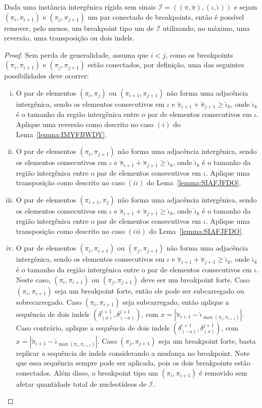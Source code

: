 \begin{lemma}\label{lemma:XLFWKWTV}
Dada uma instância intergênica rígida sem sinais $\mathcal{I}=((\pi,\breve\pi),(\iota,\breve\iota))$ e sejam $(\pi_i,\pi_{i+1})$ e $(\pi_j,\pi_{j+1})$ um par conectado de breakpoints, então é possível remover, pelo menos, um breakpoint tipo um de $\mathcal{I}$ utilizando, no máximo, uma reversão, uma transposição ou dois indels.
\end{lemma}
\begin{proof}
Sem perda de generalidade, assuma que $i < j$, como os breakpoints $(\pi_i,\pi_{i+1})$ e $(\pi_j,\pi_{j+1})$ estão conectados, por definição, uma das seguintes possibilidades deve ocorrer:
\begin{enumerate}[i.]
  \item O par de elementos $(\pi_i,\pi_{j})$ ou $(\pi_{i+1},\pi_{j+1})$ não forma uma adjacência intergênica, sendo os elementos consecutivos em $\iota$ e $\breve\pi_{i+1} + \breve\pi_{j+1} \ge \breve\iota_k$, onde $\breve\iota_k$ é o tamanho da região intergênica entre o par de elementos consecutivos em $\iota$. Aplique uma reversão como descrito no caso $(i)$ do Lema~\ref{lemma:IMYFBWDY}.
  \item O par de elementos $(\pi_i,\pi_{j+1})$ não forma uma adjacência intergênica, sendo os elementos consecutivos em $\iota$ e $\breve\pi_{i+1} + \breve\pi_{j+1} \ge \breve\iota_k$, onde $\breve\iota_k$ é o tamanho da região intergênica entre o par de elementos consecutivos em $\iota$. Aplique uma transposição como descrito no caso $(ii)$ do Lema~\ref{lemma:SIAFJFDO}.
  \item O par de elementos $(\pi_{i+1},\pi_{j})$ não forma uma adjacência intergênica, sendo os elementos consecutivos em $\iota$ e $\breve\pi_{i+1} + \breve\pi_{j+1} \ge \breve\iota_k$, onde $\breve\iota_k$ é o tamanho da região intergênica entre o par de elementos consecutivos em $\iota$. Aplique uma transposição como descrito no caso $(iii)$ do Lema~\ref{lemma:SIAFJFDO}.
  \item O par de elementos $(\pi_{i},\pi_{i+1})$ ou $(\pi_{j},\pi_{j+1})$ não forma uma adjacência intergênica, sendo os elementos consecutivos em $\iota$ e $\breve\pi_{i+1} + \breve\pi_{j+1} \ge \breve\iota_k$, onde $\breve\iota_k$ é o tamanho da região intergênica entre o par de elementos consecutivos em $\iota$. Neste caso, $(\pi_{i},\pi_{i+1})$ ou $(\pi_{j},\pi_{j+1})$ deve ser um breakpoint forte. Caso $(\pi_{i},\pi_{i+1})$ seja um breakpoint forte, então ele pode ser subcarregado ou sobrecarregado. Caso $(\pi_{i},\pi_{i+1})$ seja subcarregado, então aplique a sequência de dois indels $(\delta^{i+1}_{(x)}, \delta^{j+1}_{(-x)})$, com $x=|\breve\pi_{i+1} - \breve\iota_{\max(\pi_i, \pi_{i+1})}|$. Caso contrário, aplique a sequência de dois indels $(\delta^{i+1}_{(-x)}, \delta^{j+1}_{(x)})$, com $x=|\breve\pi_{i+1} - \breve\iota_{\max(\pi_i, \pi_{i+1})}|$. Caso $(\pi_{j},\pi_{j+1})$ seja um breakpoint forte, basta replicar a sequência de indels considerando a mudança no breakpoint. Note que essa sequência sempre pode ser aplicada, pois os dois breakpoints estão conectados. Além disso, o breakpoint tipo um $(\pi_i,\pi_{i+1})$ é removido sem afetar quantidade total de nucleotídeos de $\mathcal{I}$.  

\end{enumerate}
\end{proof}
